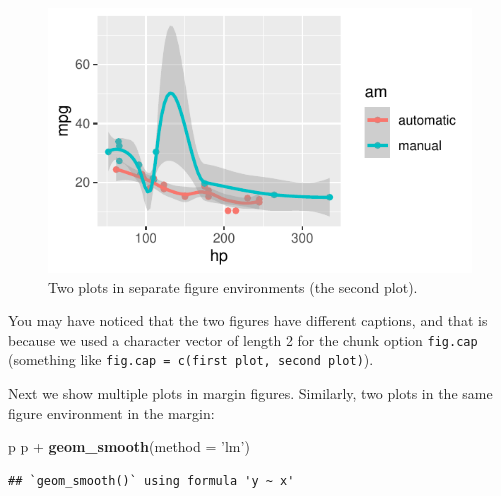 \documentclass[]{tufte-book}
\newenvironment{Shaded}{}{}
\newcommand{\DataTypeTok}[1]{\textcolor[rgb]{0.56,0.13,0.00}{#1}}
\newcommand{\KeywordTok}[1]{\textcolor[rgb]{0.00,0.44,0.13}{\textbf{#1}}}
\newcommand{\NormalTok}[1]{#1}
\newcommand{\OperatorTok}[1]{\textcolor[rgb]{0.40,0.40,0.40}{#1}}
\newcommand{\StringTok}[1]{\textcolor[rgb]{0.25,0.44,0.63}{#1}}
\begin{document}
\begin{figure}
\includegraphics{deleteme_files/figure-latex/fig-two-separate-2} \caption[Two plots in separate figure environments (the second plot)]{Two plots in separate figure environments (the second plot).}\label{fig:fig-two-separate-2}
\end{figure}

You may have noticed that the two figures have different captions, and
that is because we used a character vector of length 2 for the chunk
option \texttt{fig.cap} (something like
\texttt{fig.cap\ =\ c(\textquotesingle{}first\ plot\textquotesingle{},\ \textquotesingle{}second\ plot\textquotesingle{})}).

Next we show multiple plots in margin figures. Similarly, two plots in
the same figure environment in the margin:

\begin{Shaded}
\begin{Highlighting}[]
\NormalTok{p}
\NormalTok{p }\OperatorTok{+}\StringTok{ }\KeywordTok{geom_smooth}\NormalTok{(}\DataTypeTok{method =} \StringTok{'lm'}\NormalTok{)}
\end{Highlighting}
\end{Shaded}

\begin{verbatim}
## `geom_smooth()` using formula 'y ~ x'
\end{verbatim}
\end{document}
